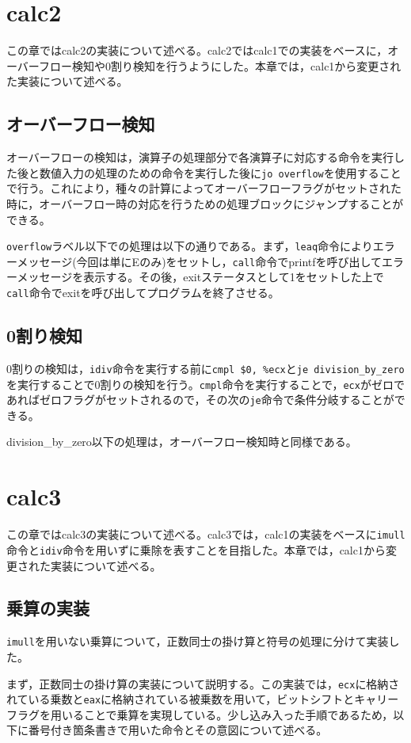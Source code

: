 \documentclass[a4paper]{jsarticle}
\newcommand{\var}[1]{\texttt{#1}}
\begin{document}
\section{calc2}
この章ではcalc2の実装について述べる。calc2ではcalc1での実装をベースに，オーバーフロー検知や0割り検知を行うようにした。本章では，calc1から変更された実装について述べる。

\subsection{オーバーフロー検知}
オーバーフローの検知は，演算子の処理部分で各演算子に対応する命令を実行した後と数値入力の処理のための命令を実行した後に\var{jo overflow}を使用することで行う。これにより，種々の計算によってオーバーフローフラグがセットされた時に，オーバーフロー時の対応を行うための処理ブロックにジャンプすることができる。

\var{overflow}ラベル以下での処理は以下の通りである。まず，\var{leaq}命令によりエラーメッセージ(今回は単にEのみ)をセットし，\var{call}命令でprintfを呼び出してエラーメッセージを表示する。その後，exitステータスとして1をセットした上で\var{call}命令でexitを呼び出してプログラムを終了させる。

\subsection{0割り検知}
0割りの検知は，\var{idiv}命令を実行する前に\var{cmpl \$0, \%ecx}と\var{je division\_by\_zero}を実行することで0割りの検知を行う。\var{cmpl}命令を実行することで，\var{ecx}がゼロであればゼロフラグがセットされるので，その次の\var{je}命令で条件分岐することができる。

division\_by\_zero以下の処理は，オーバーフロー検知時と同様である。

\section{calc3}
この章ではcalc3の実装について述べる。calc3では，calc1の実装をベースに\var{imull}命令と\var{idiv}命令を用いずに乗除を表すことを目指した。本章では，calc1から変更された実装について述べる。

\subsection{乗算の実装}
\var{imull}を用いない乗算について，正数同士の掛け算と符号の処理に分けて実装した。

まず，正数同士の掛け算の実装について説明する。この実装では，\var{ecx}に格納されている乗数と\var{eax}に格納されている被乗数を用いて，ビットシフトとキャリーフラグを用いることで乗算を実現している。少し込み入った手順であるため，以下に番号付き箇条書きで用いた命令とその意図について述べる。
\end{document}
